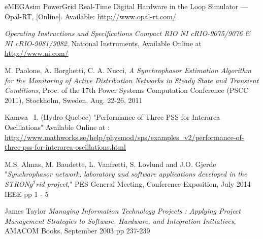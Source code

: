 \documentclass[conference]{IEEEtran}
\begin{document}
\begin{thebibliography}{1}
 eMEGAsim PowerGrid Real-Time Digital Hardware in the Loop Simulator — Opal-RT, [Online]. Available: \url{http://www.opal-rt.com/}

 \emph{Operating Instructions and Specifications Compact RIO NI cRIO-9075/9076 \& NI cRIO-9081/9082}, National Instruments, Available Online at \url{http://www.ni.com/}

 M. Paolone, A. Borghetti, C. A. Nucci, \emph{A Synchrophasor Estimation Algorithm for the Monitoring of Active Distribution Networks in Steady State and Transient Conditions}, Proc. of the 17th Power Systems Computation Conference (PSCC 2011), Stockholm, Sweden, Aug. 22-26, 2011 

 Kamwa \ I. (Hydro-Quebec) "Performance of Three PSS for Interarea Oscillations" Available Online at : \url{http://www.mathworks.se/help/physmod/sps/examples_v2/performance-of-three-pss-for-interarea-oscillations.html}



 M.S. Almas, M. Baudette, L. Vanfretti, S. Lovlund and J.O. Gjerde "\emph{Synchrophasor network, laboratory and software applications developed in the STRON$g^{2}$rid project}," PES General Meeting, Conference Exposition, July 2014 IEEE pp 1 - 5

 James Taylor \emph{Managing Information Technology Projects : Applying Project Management Strategies to Software, Hardware, and Integration Initiatives}, AMACOM Books, September 2003 pp 237-239




\end{thebibliography}
\end{document}
